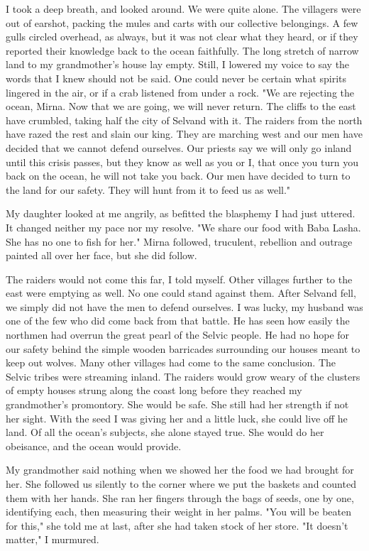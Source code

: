 I took a deep breath, and looked around. We were quite alone. The villagers were out of earshot, packing the mules and carts with our collective belongings. A few gulls circled overhead, as always, but it was not clear what they heard, or if they reported their knowledge back to the ocean faithfully. The long stretch of narrow land to my grandmother's house lay empty. Still, I lowered my voice to say the words that I knew should not be said. One could never be certain what spirits lingered in the air, or if a crab listened from under a rock. "We are rejecting the ocean, Mirna. Now that we are going, we will never return. The cliffs to the east have crumbled, taking half the city of Selvand with it. The raiders from the north have razed the rest and slain our king. They are marching west and our men have decided that we cannot defend ourselves. Our priests say we will only go inland until this crisis passes, but they know as well as you or I, that once you turn you back on the ocean, he will not take you back. Our men have decided to turn to the land for our safety. They will hunt from it to feed us as well."

My daughter looked at me angrily, as befitted the blasphemy I had just uttered. It changed neither my pace nor my resolve. "We share our food with Baba Lasha. She has no one to fish for her." Mirna followed, truculent, rebellion and outrage painted all over her face, but she did follow.

The raiders would not come this far, I told myself. Other villages further to the east were emptying as well. No one could stand against them. After Selvand fell, we simply did not have the men to defend ourselves. I was lucky, my husband was one of the few who did come back from that battle. He has seen how easily the northmen had overrun the great pearl of the Selvic people. He had no hope for our safety behind the simple wooden barricades surrounding our houses meant to keep out wolves. Many other villages had come to the same conclusion. The Selvic tribes were streaming inland. The raiders would grow weary of the clusters of empty houses strung along the coast long before they reached my grandmother's promontory. She would be safe. She still had her strength if not her sight. With the seed I was giving her and a little luck, she could live off he land. Of all the ocean's subjects, she alone stayed true. She would do her obeisance, and the ocean would provide.

My grandmother said nothing when we showed her the food we had brought for her. She followed us silently to the corner where we put the baskets and counted them with her hands. She ran her fingers through the bags of seeds, one by one, identifying each, then measuring their weight in her palms. "You will be beaten for this," she told me at last, after she had taken stock of her store. "It doesn't matter," I murmured.

